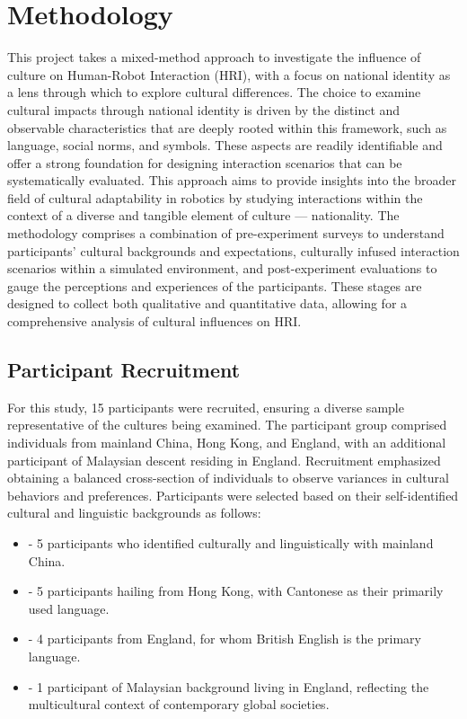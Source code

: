 \chapter{Methodology}

This project takes a mixed-method approach to investigate the influence of culture on Human-Robot Interaction (HRI), with a focus on national identity as a lens through which to explore cultural differences. The choice to examine cultural impacts through national identity is driven by the distinct and observable characteristics that are deeply rooted within this framework, such as language, social norms, and symbols. These aspects are readily identifiable and offer a strong foundation for designing interaction scenarios that can be systematically evaluated. This approach aims to provide insights into the broader field of cultural adaptability in robotics by studying interactions within the context of a diverse and tangible element of culture — nationality. The methodology comprises a combination of pre-experiment surveys to understand participants' cultural backgrounds and expectations, culturally infused interaction scenarios within a simulated environment, and post-experiment evaluations to gauge the perceptions and experiences of the participants. These stages are designed to collect both qualitative and quantitative data, allowing for a comprehensive analysis of cultural influences on HRI.

\section{Participant Recruitment}

For this study, 15 participants were recruited, ensuring a diverse sample representative of the cultures being examined. The participant group comprised individuals from mainland China, Hong Kong, and England, with an additional participant of Malaysian descent residing in England. Recruitment emphasized obtaining a balanced cross-section of individuals to observe variances in cultural behaviors and preferences. Participants were selected based on their self-identified cultural and linguistic backgrounds as follows:

\begin{itemize}
    \item - 5 participants who identified culturally and linguistically with mainland China.
    \item - 5 participants hailing from Hong Kong, with Cantonese as their primarily used language.
    \item - 4 participants from England, for whom British English is the primary language.
    \item - 1 participant of Malaysian background living in England, reflecting the multicultural context of contemporary global societies.
\end{itemize}

